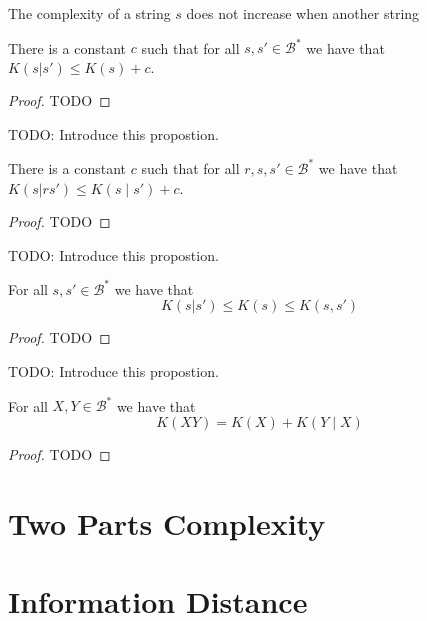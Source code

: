 The complexity of a string $s$ does not increase when another string

\begin{proposition}
\label{prop:kolmogorov_conditional}
There is a constant $c$ such that for all $s, s'\in\mathcal{B}^{\ast}$ we have that $K(s | s' ) \leq K(s) + c$.
\end{proposition}
\begin{proof}
{\color{red} TODO}
\end{proof}

{\color{red} TODO: Introduce this propostion.}

\begin{proposition}
\label{prop:kolmogorov_joint_conditional}
There is a constant $c$ such that for all $r ,s, s'\in\mathcal{B}^{\ast}$ we have that $K(s | rs' ) \leq K(s \mid s') + c$.
\end{proposition}
\begin{proof}
{\color{red} TODO}
\end{proof}


{\color{red} TODO: Introduce this propostion.}

\begin{proposition}
\label{prop:kolmogorov_relations}
For all $s, s'\in\mathcal{B}^{\ast}$ we have that
\[
K(s | s' ) \leq K(s) \leq K(s, s')
\]
\end{proposition}
\begin{proof}
{\color{red} TODO}
\end{proof}

{\color{red} TODO: Introduce this propostion.}

\begin{proposition}
\label{prop:kolmogorov_relations}
For all $X, Y\in\mathcal{B}^{\ast}$ we have that
\[
K(XY) = K(X) + K(Y \mid X)
\]
\end{proposition}
\begin{proof}
{\color{red} TODO}
\end{proof}


%
%

\section{Two Parts Complexity}
\label{sec:two_parts_complexity}


%
%

\section{Information Distance}
\label{sec:information_distance}

